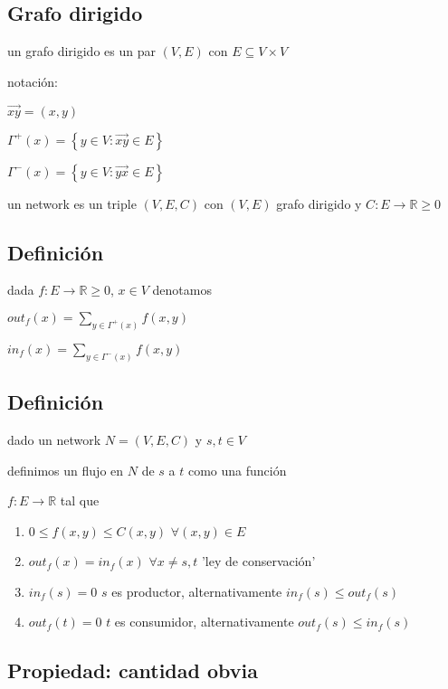 \documentclass[12pt]{article}
\begin{document}
\subsection*{Grafo dirigido}

un grafo dirigido es un par $(V, E)$ con $E \subseteq V \times V$

notación: 

$\overrightarrow{xy} = (x, y)$

$\Gamma^{+}(x) = \left\{y \in V : \overrightarrow{xy} \in E\right\}$ 

$ \Gamma^{-}(x) = \left\{y \in V: \overrightarrow{yx} \in E\right\}$

un network es un triple $(V, E, C)$ con $(V, E)$ grafo dirigido y $C: E \rightarrow \mathbb{R} \geq 0$

\subsection*{Definición}

dada $f : E \rightarrow \mathbb{R} \geq 0$, $x \in V$ denotamos

$out_{f}(x) = \sum_{y \in \Gamma^{+}(x)}^{} f(x, y)$

$in_{f}(x) = \sum_{y \in \Gamma^{-}(x)}^{} f(x, y)$

\subsection*{Definición}

dado un network $N = (V, E, C)$ y $s,t \in V$

definimos un flujo en $N$ de $s$ a $t$ como una función

$f: E \rightarrow \mathbb{R}$ tal que

\begin{enumerate}
\item $0 \leq f(x, y) \leq C(x,y)$  $\forall(x, y) \in E$
\item $out_{f}(x) = in_{f}(x)$ $\forall x \ne s, t$    'ley de conservación'
\item $in_{f}(s) = 0$      $s$ es productor, alternativamente $in_{f}(s) \leq out_{f}(s)$
\item $out_{f}(t) = 0$    $t$ es consumidor, alternativamente $out_{f}(s) \leq in_{f}(s)$
\end{enumerate}

\subsection*{Propiedad: cantidad obvia}
\end{document}
